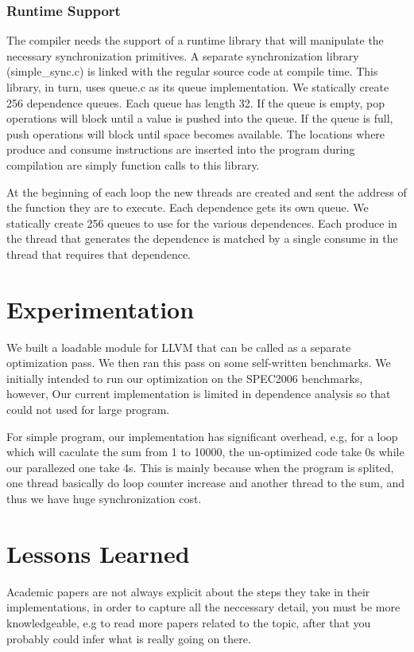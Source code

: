 \documentclass[11pt, letter]{article}
\begin{document}
\subsubsection{Runtime Support}
The compiler needs the support of a runtime library that will manipulate the necessary synchronization primitives.  A separate synchronization library (simple\_sync.c) is linked with the regular source code at compile time.  This library, in turn, uses queue.c as its queue implementation.  We statically create 256 dependence queues.  Each queue has length 32.  If the queue is empty, pop operations will block until a value is pushed into the queue.  If the queue is full, push operations will block until space becomes available.  The locations where produce and consume instructions are inserted into the program during compilation are simply function calls to this library.

At the beginning of each loop the new threads are created and sent the address of the function they are to execute.  Each dependence gets its own queue. We statically create 256 queues to use for the various dependences.  Each produce in the thread that generates the dependence is matched by a single consume in the thread that requires that dependence.

\section{Experimentation}
We built a loadable module for LLVM that can be called as a separate optimization pass.  We then ran this pass on some self-written benchmarks.  We initially intended to run our optimization on the SPEC2006 benchmarks, however, Our current implementation is limited in dependence analysis so that could not used for large program. 

For simple program, our implementation has significant overhead, e.g, for a loop which will caculate the sum from 1 to 10000, the un-optimized code take 0s while our parallezed one take 4s. This is mainly because when the program is splited, one thread basically do loop counter increase and another thread to the sum, and thus we have huge synchronization cost.


\section{Lessons Learned}
Academic papers are not always explicit about the steps they take in their implementations, in order to capture all the neccessary detail, you must be more knowledgeable, e.g to read more papers related to the topic, after that you probably could infer what is really going on there.
\end{document}

